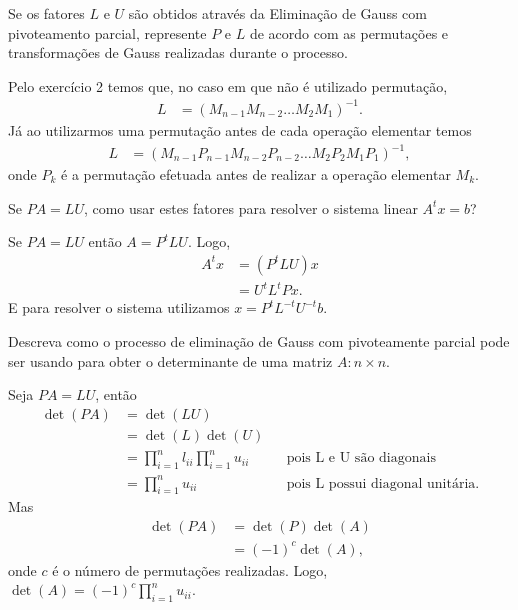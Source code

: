 \documentclass[a4paper,12pt, leqno, answers]{exam}
\begin{document}
\begin{questions}
     Se os fatores $L$ e $U$ s\~{a}o obtidos atrav\'{e}s da Elimina\c{c}\~{a}o de Gauss com pivoteamento parcial, represente $P$ e $L$ de acordo com as permuta\c{c}\~{o}es e transforma\c{c}\~{o}es de Gauss realizadas durante o processo.
    \begin{solution}
        Pelo exerc\'{i}cio 2 temos que, no caso em que n\~{a}o \'{e} utilizado permuta\c{c}\~{a}o,
        \begin{align*}
            L &= \left( M_{n - 1} M_{n - 2} \ldots M_2 M_1 \right)^{-1}.
        \end{align*}
        J\'{a} ao utilizarmos uma permuta\c{c}\~{a}o antes de cada opera\c{c}\~{a}o elementar temos
        \begin{align*}
            L &= \left( M_{n - 1} P_{n - 1} M_{n - 2} P_{n - 2} \ldots M_2 P_2 M_1 P_1 \right)^{-1},
        \end{align*}
        onde $P_k$ \'{e} a permuta\c{c}\~{a}o efetuada antes de realizar a opera\c{c}\~{a}o elementar $M_k$.
    \end{solution}

    \question Se $P A = L U$, como usar estes fatores para resolver o sistema linear $A^t x = b$?
    \begin{solution}
        Se $P A = L U$ ent\~{a}o $A = P^t L U$. Logo,
        \begin{align*}
            A^t x &= \left( P^t L U \right) x \\
            &= U^t L^t P x.
        \end{align*}
        E para resolver o sistema utilizamos $x = P^t L^{-t} U^{-t} b$.
    \end{solution}

    \question Descreva como o processo de elimina\c{c}\~{a}o de Gauss com pivoteamente parcial pode ser usando para obter o determinante de uma matriz $A : n \times n$.
    \begin{solution}
        Seja $P A = L U$, ent\~{a}o
        \begin{align*}
            \det(P A) &= \det(L U) \\
            &= \det(L) \det (U) \\
            &= \prod_{i = 1}^n l_{ii} \prod_{i = 1}^n u_{ii} && \text{pois L e U s\~{a}o diagonais} \\
            &= \prod_{i = 1}^n u_{ii} && \text{pois L possui diagonal unit\'{a}ria}.
        \end{align*}
        Mas
        \begin{align*}
            \det(P A) &= \det(P) \det(A) \\
            &= (-1)^{c} \det(A),
        \end{align*}
        onde $c$ \'{e} o n\'{u}mero de permuta\c{c}\~{o}es realizadas. Logo, $\det(A) = (-1)^c \prod_{i = 1}^n u_{ii}$.
    \end{solution}


\end{questions}
\end{document}
